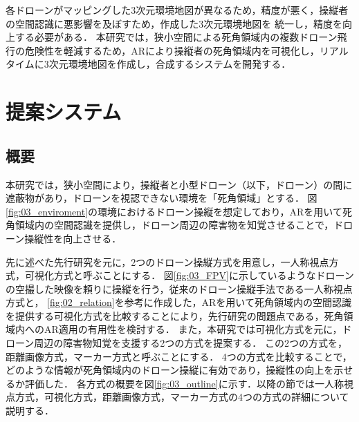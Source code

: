 \documentclass[a4paper,10pt,twocolumn,uplatex]{jsarticle}
\begin{document}
各ドローンがマッピングした3次元環境地図が異なるため，精度が悪く，操縦者の空間認識に悪影響を及ぼすため，作成した3次元環境地図を
統一し，精度を向上する必要がある．
本研究では，狭小空間による死角領域内の複数ドローン飛行の危険性を軽減するため，ARにより操縦者の死角領域内を可視化し，リアルタイムに3次元環境地図を作成し，合成するシステムを開発する．





\section{提案システム}
\subsection{概要}
本研究では，狭小空間により，操縦者と小型ドローン（以下，ドローン）の間に遮蔽物があり，ドローンを視認できない環境を「死角領域」とする．
図\ref{fig:03_enviroment}の環境におけるドローン操縦を想定しており，ARを用いて死角領域内の空間認識を提供し，ドローン周辺の障害物を知覚させることで，ドローン操縦性を向上させる．
\par
先に述べた先行研究\cite{Erat}を元に，2つのドローン操縦方式を用意し，一人称視点方式，可視化方式と呼ぶことにする．
図\ref{fig:03_FPV}に示しているようなドローンの空撮した映像を頼りに操縦を行う，従来のドローン操縦手法である一人称視点方式と，
\ref{fig:02_relation}を参考に作成した，ARを用いて死角領域内の空間認識を提供する可視化方式を比較することにより，先行研究の問題点である，死角領域内へのAR適用の有用性を検討する．
また，本研究では可視化方式を元に，ドローン周辺の障害物知覚を支援する2つの方式を提案する．
この2つの方式を，距離画像方式，マーカー方式と呼ぶことにする．
4つの方式を比較することで，どのような情報が死角領域内のドローン操縦に有効であり，操縦性の向上を示せるか評価した．
各方式の概要を図\ref{fig:03_outline}に示す．以降の節では一人称視点方式，可視化方式，距離画像方式，マーカー方式の4つの方式の詳細について説明する．
\end{document}
